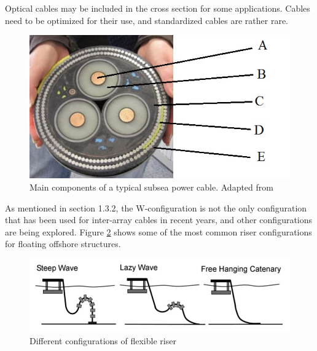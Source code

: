 \noindent Optical cables may be included in the cross section for some applications. Cables need to be optimized for their use, and standardized cables are rather rare. 


\begin{figure}[H]
\centering
\includegraphics[scale=0.8]{figures/pcable}
\caption[$\; \:$Main components of a typical subsea power cable]{Main components of a typical subsea power cable. Adapted from  \cite{Boltinha2016} }
 \label{fig:pcable}
\end{figure}

\noindent As mentioned in section 1.3.2, the W-configuration is not the only configuration that has been used for inter-array cables in recent years, and other configurations are being explored. Figure \ref{fig:config} shows some of the most common riser configurations for floating offshore structures. 

\begin{figure}[H]
\centering
\includegraphics[scale=0.8]{figures/config}
\caption[$\; \:$Different configurations of flexible riser]{Different configurations of flexible riser \cite{Thies2012}}
 \label{fig:config}
\end{figure}

